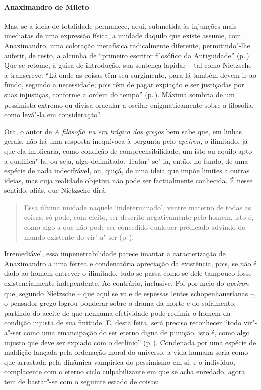 \paragraph{Anaximandro de Mileto} Mas, se a ideia de totalidade permanece,
 aqui, submetida às injunções mais imediatas de uma expressão física, a
 unidade daquilo que existe assume, com Anaximandro, uma coloração metafísica
 radicalmente diferente, permitindo"-lhe auferir, de resto, a alcunha de
 ``primeiro escritor filosófico da Antiguidade'' (p.\,\pageref{primeiroescritor}). 
 Que se retome, à guisa de introdução, sua sentença
 lapidar -- tal como Nietzsche a transcreve: ``Lá onde as coisas têm seu
 surgimento, para lá também devem ir ao fundo, segundo a necessidade; pois
 têm de pagar expiação e ser justiçadas por suas injustiças, conforme a ordem
 do tempo'' (p.\,\pageref{laondeascoisas}). Máxima sombria de um pessimista
 extremo ou divisa oracular a oscilar enigmaticamente sobre a filosofia, como
 levá"-la em consideração? 

Ora, o autor de \textit{A filosofia na era trágica dos gregos} bem sabe que,
em linhas gerais, não há uma resposta inequívoca à pergunta pelo
\textit{apeiron}, o ilimitado, já que ela implicaria, como condição de
 compreensibilidade, um isto ou aquilo apto a qualificá"-la, ou seja, algo
 delimitado. Tratar"-se"-ia, então, no fundo, de uma espécie de nada
 indecifrável, ou, quiçá, de uma ideia que impõe limites a outras ideias, mas
 cuja realidade objetiva não pode ser factualmente conhecida. É nesse
 sentido, aliás, que Nietzsche dirá:

\begin{quote} 
Essa última unidade naquele `indeterminado', ventre materno
 de todas as coisas, só pode, com efeito, ser descrito negativamente pelo
 homem, isto é, como algo a que não pode ser concedido qualquer predicado
 advindo do mundo existente do vir"-a"-ser (p.\,\pageref{essaultimaunidade}).
\end{quote} 

 Irremediável, essa impenetrabilidade parece imantar a caracterização de
 Anaximandro a uma férrea e condenatória apreciação da existência, pois, se
 não é dado ao homem entrever o ilimitado, tudo se passa como se dele
 tampouco fosse existencialmente independente. Ao contrário, inclusive. Foi
 por meio do \textit{apeiron} que, segundo Nietzsche -- que aqui se vale de
 espessas lentes schopenhauerianas --, o pensador grego logrou ponderar sobre
 o drama da morte e do sofrimento, partindo do aceite de que nenhuma
 efetividade pode redimir o homem da condição injusta de sua finitude. E,
 desta feita, será preciso reconhecer ``todo vir"-a"-ser como uma emancipação
 do ser eterno digna de punição, isto é, como algo injusto que deve ser
 expiado com o declínio'' (p.\,\pageref{sereterno}). Condenada por uma espécie
 de maldição lançada pela ordenação moral do universo, a vida humana seria
 como que arrastada pela dinâmica vampírica do pessimismo em si; e o
 indivíduo, complacente com o eterno ciclo culpabilizante em que se acha
 enredado, agora tem de bastar"-se com o seguinte estado de coisas: 

